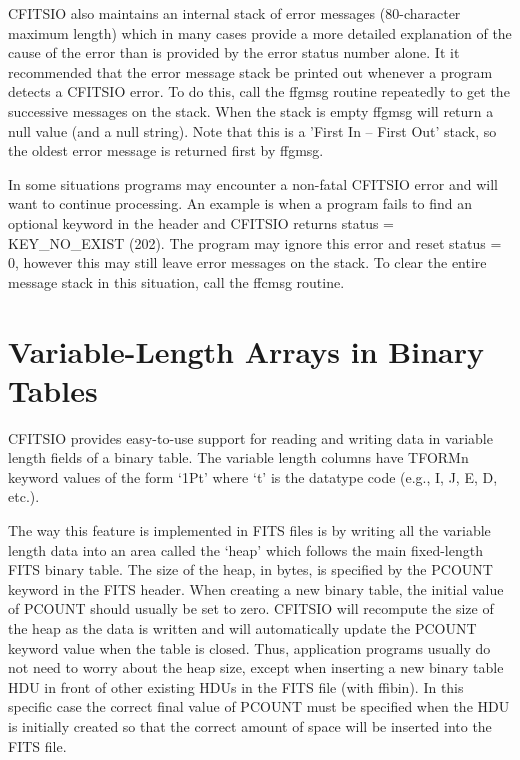 CFITSIO also maintains an internal stack of error messages
(80-character maximum length)  which in many cases provide a more
detailed explanation of the cause of the error than is provided by the
error status number alone.  It it recommended that the error message
stack be printed out whenever a program detects a CFITSIO error.  To do
this, call the ffgmsg routine repeatedly to get the successive messages
on the stack.  When the stack is empty ffgmsg will return a null value
(and a null string).  Note that this is a 'First In -- First Out'
stack, so the oldest error message is returned first by ffgmsg.

In some situations programs may encounter a non-fatal CFITSIO error and
will want to continue processing.  An example is when a program fails
to find an optional keyword in the header and CFITSIO returns status =
KEY\_NO\_EXIST (202).  The program may ignore this error and reset
status = 0, however this may still leave error messages on the stack.
To clear the entire message stack in this situation, call the ffcmsg
routine.


\section{Variable-Length Arrays in Binary Tables}

CFITSIO provides easy-to-use support for reading and writing data in
variable length fields of a binary table.  The variable length columns
have TFORMn keyword values of the form `1Pt' where `t' is the datatype
code (e.g., I, J, E, D, etc.).

The way this feature is implemented in FITS files is by writing all the
variable length data into an area called the `heap' which follows the
main fixed-length FITS binary table.  The size of the heap, in bytes,
is specified by the PCOUNT keyword in the FITS header.  When creating a
new binary table, the initial value of PCOUNT should usually be set to
zero.  CFITSIO will recompute the size of the heap as the data is
written and will automatically update the PCOUNT keyword value when the
table is closed. Thus, application programs usually do not need to
worry about the heap size, except when inserting a new binary table HDU
in front of other existing HDUs in the FITS file (with ffibin).  In
this specific case the correct final value of PCOUNT must be specified
when the HDU is initially created so that the correct amount of space
will be inserted into the FITS file.

